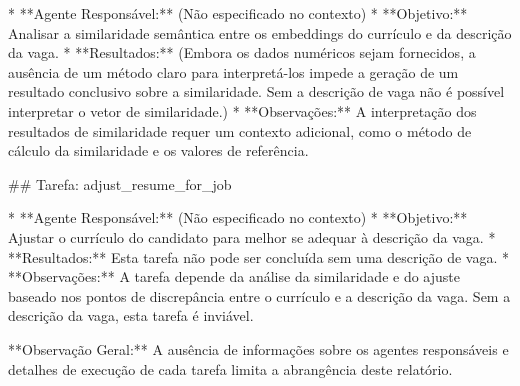 * **Agente Responsável:** (Não especificado no contexto)
* **Objetivo:** Analisar a similaridade semântica entre os embeddings do currículo e da descrição da vaga.
* **Resultados:** (Embora os dados numéricos sejam fornecidos, a ausência de um método claro para interpretá-los impede a geração de um resultado conclusivo sobre a similaridade. Sem a descrição de vaga não é possível interpretar o vetor de similaridade.)
* **Observações:** A interpretação dos resultados de similaridade requer um contexto adicional, como o método de cálculo da similaridade e os valores de referência.

## Tarefa: adjust_resume_for_job

* **Agente Responsável:** (Não especificado no contexto)
* **Objetivo:** Ajustar o currículo do candidato para melhor se adequar à descrição da vaga.
* **Resultados:** Esta tarefa não pode ser concluída sem uma descrição de vaga.
* **Observações:**  A tarefa depende da análise da similaridade e do ajuste baseado nos pontos de discrepância entre o currículo e a descrição da vaga.  Sem a descrição da vaga, esta tarefa é inviável.

**Observação Geral:** A ausência de informações sobre os agentes responsáveis e detalhes de execução de cada tarefa limita a abrangência deste relatório.